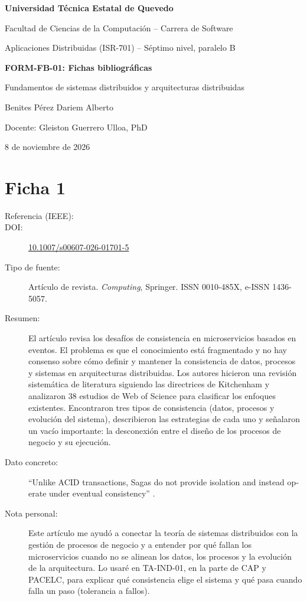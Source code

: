 \documentclass[11pt,a4paper]{article}
\newcommand{\doi}[1]{\href{https://doi.org/#1}{#1}}
\begin{document}
\begin{center}
  {\large\bfseries Universidad Técnica Estatal de Quevedo\par}
  {Facultad de Ciencias de la Computación -- Carrera de Software\par}
  \vspace{6pt}
  {Aplicaciones Distribuidas (ISR-701) -- Séptimo nivel, paralelo B\par}
  \vspace{14pt}
  {\Large\bfseries FORM-FB-01: Fichas bibliográficas\par}
  \vspace{4pt}
  {\large Fundamentos de sistemas distribuidos y arquitecturas distribuidas\par}
  \vspace{10pt}
  Benites Pérez Dariem Alberto\par
  Docente: Gleiston Guerrero Ulloa, PhD\par
  8 de noviembre de 2026\par
\end{center}

\vspace{10pt}

\section{Ficha 1}
\begin{description}
  \item[Referencia (IEEE):] 
  \item[DOI:] \doi{10.1007/s00607-026-01701-5}
  \item[Tipo de fuente:] Artículo de revista. \emph{Computing}, Springer. ISSN 0010-485X, e-ISSN 1436-5057.
  \item[Resumen:] El artículo revisa los desafíos de consistencia en microservicios basados en eventos. El problema es que el conocimiento está fragmentado y no hay consenso sobre cómo definir y mantener la consistencia de datos, procesos y sistemas en arquitecturas distribuidas. Los autores hicieron una revisión sistemática de literatura siguiendo las directrices de Kitchenham y analizaron 38 estudios de Web of Science para clasificar los enfoques existentes. Encontraron tres tipos de consistencia (datos, procesos y evolución del sistema), describieron las estrategias de cada uno y señalaron un vacío importante: la desconexión entre el diseño de los procesos de negocio y su ejecución.
  \item[Dato concreto:] \foreignquote{american}{Unlike ACID transactions, Sagas do not provide isolation and instead operate under eventual consistency} \cite[Sec.~2.6, p.~6]{bacao2026}.
  \item[Nota personal:] Este artículo me ayudó a conectar la teoría de sistemas distribuidos con la gestión de procesos de negocio y a entender por qué fallan los microservicios cuando no se alinean los datos, los procesos y la evolución de la arquitectura. Lo usaré en TA-IND-01, en la parte de CAP y PACELC, para explicar qué consistencia elige el sistema y qué pasa cuando falla un paso (tolerancia a fallos).
\end{description}
\end{document}
